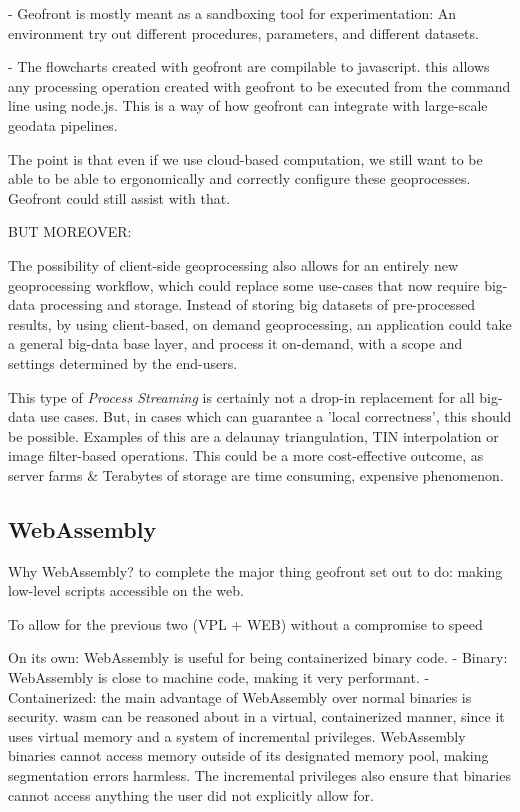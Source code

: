 - Geofront is mostly meant as a sandboxing tool for experimentation: An environment try out different procedures, parameters, and different datasets. 

- The flowcharts created with geofront are compilable to javascript. this allows any processing operation created with geofront to be executed from the command line using node.js. This is a way of how geofront can integrate with large-scale geodata pipelines. 

The point is that even if we use cloud-based computation, we still want to be able to be able to ergonomically and correctly configure these geoprocesses. Geofront could still assist with that.

BUT MOREOVER:

The possibility of client-side geoprocessing also allows for an entirely new geoprocessing workflow, which could replace some use-cases that now require big-data processing and storage. Instead of storing big datasets of pre-processed results, by using client-based, on demand geoprocessing, an application could take a general big-data base layer, and process it on-demand, with a scope and settings determined by the end-users. 

This type of \emph{Process Streaming} is certainly not a drop-in replacement for all big-data use cases. But, in cases which can guarantee a 'local correctness', this should be possible. Examples of this are a delaunay triangulation, TIN interpolation or image filter-based operations. This could be a more cost-effective outcome, as server farms \& Terabytes of storage are time consuming, expensive phenomenon.

\subsection{WebAssembly}

Why WebAssembly? to complete the major thing geofront set out to do: making low-level scripts accessible on the web. 

To allow for the previous two (VPL + WEB) without a compromise to speed

On its own: WebAssembly is useful for being containerized binary code. 
- Binary: WebAssembly is close to machine code, making it very performant.
- Containerized: the main advantage of WebAssembly over normal binaries is security. wasm can be reasoned about in a virtual, containerized manner, since it uses virtual memory and a system of incremental privileges. WebAssembly binaries cannot access memory outside of its designated memory pool, making segmentation errors harmless. The incremental privileges also ensure that binaries cannot access anything the user did not explicitly allow for. 

